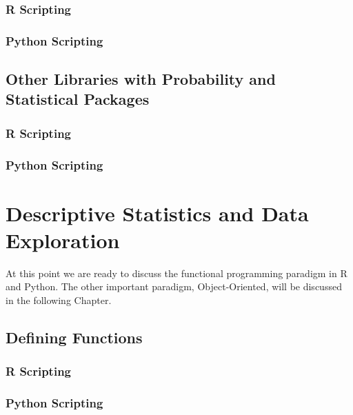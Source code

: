 \documentclass[]{book}
\theoremstyle{definition}
\theoremstyle{definition}
\theoremstyle{definition}
\theoremstyle{remark}
\begin{document}
\subsection{R Scripting}\label{r-scripting-6}

\subsection{Python Scripting}\label{python-scripting-6}

\section{Other Libraries with Probability and Statistical
Packages}\label{other-libraries-with-probability-and-statistical-packages}

\subsection{R Scripting}\label{r-scripting-7}

\subsection{Python Scripting}\label{python-scripting-7}

\chapter{Descriptive Statistics and Data
Exploration}\label{descriptive-statistics-and-data-exploration}

At this point we are ready to discuss the functional programming
paradigm in R and Python. The other important paradigm, Object-Oriented,
will be discussed in the following Chapter.

\section{Defining Functions}\label{defining-functions-1}

\subsection{R Scripting}\label{r-scripting-8}

\subsection{Python Scripting}\label{python-scripting-8}
\end{document}
